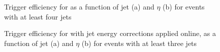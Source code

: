 \begin{figure}[hbtp]
    \centering
{}
\hfill
{}
\caption[Trigger efficiency for \HLTThreeCentralPFJet as a function of jet \pt and $\eta$]{Trigger efficiency for
\HLTThreeCentralPFJet as a function of jet \pt (a) and $\eta$ (b) for events with at least four jets}
\label{fig:top_hlt_pt_eta_4jets} 
 \end{figure}




\begin{figure}[hbtp]
    \centering
{}
\hfill
{}
\caption[Trigger efficiency for \HLTThreeCentralPFJet as a function of jet \pt and $\eta$]{Trigger efficiency for
\HLTThreeCentralPFJet with jet energy corrections applied online, as a function of jet \pt (a) and $\eta$ (b) for events
with at least three jets}
\label{fig:top_hlt_pt_eta_JEC_3jets} 
 \end{figure}

